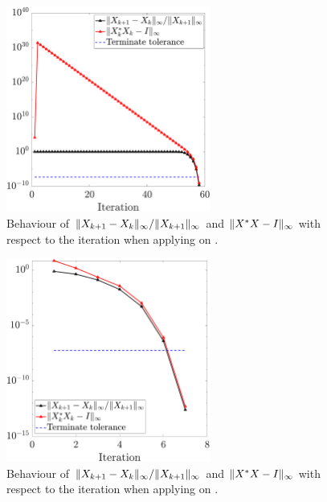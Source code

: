 \begin{figure}[H]
    \centering
    \includegraphics[width=0.6\textwidth]{../code/magic6.pdf}
    \caption{Behaviour of $\|{X_{k+1} - X_{k}}\|_\infty/\|{X_{k+1}}\|_\infty$ and $\|{X^* X - I}\|_\infty$ with respect to the iteration when applying  on .}
\end{figure}

\begin{figure}[H]
    \centering
    \includegraphics[width=0.6\textwidth]{../code/hadamard8.pdf}
    \caption{Behaviour of $\|{X_{k+1} - X_{k}}\|_\infty/\|{X_{k+1}}\|_\infty$ and $\|{X^* X - I}\|_\infty$ with respect to the iteration when applying  on .}
\end{figure}
